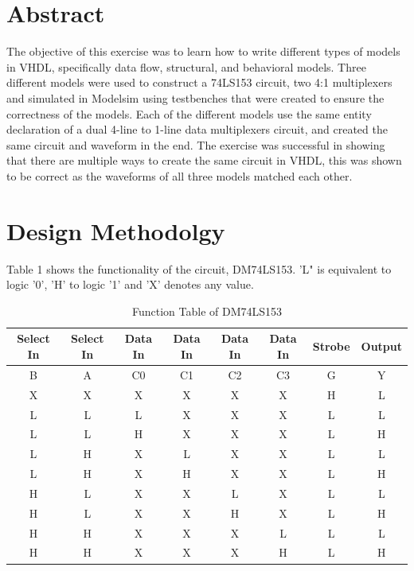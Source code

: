 \documentclass[CMPE]{KGCOEReport}
\begin{document}
\maketitle

\section*{Abstract}
The objective of this exercise was to learn how to write different types of models in VHDL, specifically data flow, structural, and behavioral models. Three different models were used to construct a 74LS153 circuit, two 4:1 multiplexers and simulated in Modelsim using testbenches that were created to ensure the correctness of the models. Each of the different models use the same entity declaration of a dual 4-line to 1-line data multiplexers circuit, and created the same circuit and waveform in the end. The exercise was successful in showing that there are multiple ways to create the same circuit in VHDL, this was shown to be correct as the waveforms of all three models matched each other.

\section*{Design Methodolgy}
 Table 1 shows the functionality of the circuit, DM74LS153. 'L" is equivalent to logic '0', 'H' to logic '1' and 'X' denotes any value.

\begin{table}[H]
	\centering
	\caption{Function Table of DM74LS153}
	\label{tab:Table 1}
	\begin{tabular}{|c|c|c|c|c|c|c|c|}
		\hline
		Select In & Select In & Data In & Data In & Data In & Data In & Strobe & Output\\ \hline
		B & A & C0 & C1 & C2 & C3 &G & Y \\ \hline 
		X & X & X & X & X & X & H & L\\ \hline
		L & L & L & X & X & X & L & L\\ \hline
		L & L & H & X & X & X & L & H\\ \hline
		L & H & X & L & X & X & L & L\\ \hline
		L & H & X & H & X & X & L & H\\ \hline
		H & L & X & X & L & X & L & L\\ \hline
		H & L & X & X & H & X & L & H\\ \hline
		H & H & X & X & X & L & L & L\\ \hline
		H & H & X & X & X & H & L & H\\ \hline
	\end{tabular}
\end{table}
\end{document}
